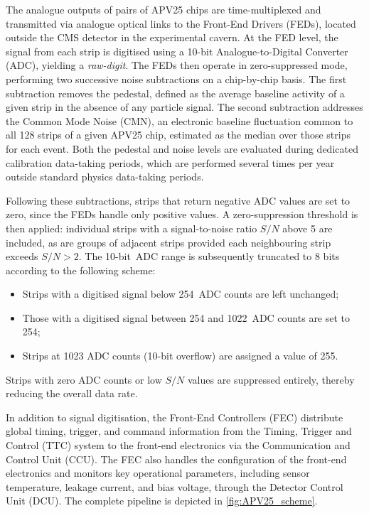 \vspace{0.5 cm}

The analogue outputs of pairs of APV25 chips are time-multiplexed and transmitted via analogue optical links to the Front-End Drivers (FEDs), located outside the CMS detector in the experimental cavern. At the FED level, the signal from each strip is digitised using a 10-bit Analogue-to-Digital Converter (ADC), yielding a \textit{raw-digit}. The FEDs then operate in zero-suppressed mode, performing two successive noise subtractions on a chip-by-chip basis. The first subtraction removes the pedestal, defined as the average baseline activity of a given strip in the absence of any particle signal. The second subtraction addresses the Common Mode Noise (CMN), an electronic baseline fluctuation common to all 128 strips of a given APV25 chip, estimated as the median over those strips for each event. Both the pedestal and noise levels are evaluated during dedicated calibration data-taking periods, which are performed several times per year outside standard physics data-taking periods.

\vspace{0.5 cm}

Following these subtractions, strips that return negative ADC values are set to zero, since the FEDs handle only positive values. A zero-suppression threshold is then applied: individual strips with a signal-to-noise ratio $S/N$ above 5 are included, as are groups of adjacent strips provided each neighbouring strip exceeds $S/N > 2$. The 10-bit~ADC range is subsequently truncated to 8 bits according to the following scheme:
\begin{itemize}
    \item Strips with a digitised signal below 254~ADC counts are left unchanged;
    \item Those with a digitised signal between 254 and 1022~ADC counts are set to 254;
    \item Strips at 1023 ADC counts (10-bit overflow) are assigned a value of 255.
\end{itemize}
Strips with zero ADC counts or low $S/N$ values are suppressed entirely, thereby reducing the overall data rate.

\vspace{0.5 cm}

In addition to signal digitisation, the Front-End Controllers (FEC) distribute global timing, trigger, and command information from the Timing, Trigger and Control (TTC) system to the front-end electronics via the Communication and Control Unit (CCU). The FEC also handles the configuration of the front-end electronics and monitors key operational parameters, including sensor temperature, leakage current, and bias voltage, through the Detector Control Unit (DCU). The complete pipeline is depicted in \cref{fig:APV25_scheme}.


